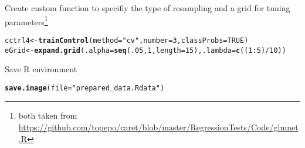 \documentclass{article}\usepackage[]{graphicx}\usepackage[]{color}
\makeatletter
\newcommand{\hlnum}[1]{\textcolor[rgb]{0.686,0.059,0.569}{#1}}%
\newcommand{\hlstr}[1]{\textcolor[rgb]{0.192,0.494,0.8}{#1}}%
\newcommand{\hlopt}[1]{\textcolor[rgb]{0,0,0}{#1}}%
\newcommand{\hlstd}[1]{\textcolor[rgb]{0.345,0.345,0.345}{#1}}%
\newcommand{\hlkwb}[1]{\textcolor[rgb]{0.69,0.353,0.396}{#1}}%
\newcommand{\hlkwc}[1]{\textcolor[rgb]{0.333,0.667,0.333}{#1}}%
\newcommand{\hlkwd}[1]{\textcolor[rgb]{0.737,0.353,0.396}{\textbf{#1}}}%
\newenvironment{kframe}{%
 \def\at@end@of@kframe{}%
 \ifinner\ifhmode%
  \def\at@end@of@kframe{\end{minipage}}%
  \begin{minipage}{\columnwidth}%
 \fi\fi%
 \def\FrameCommand##1{\hskip\@totalleftmargin \hskip-\fboxsep
 \colorbox{shadecolor}{##1}\hskip-\fboxsep
     \hskip-\linewidth \hskip-\@totalleftmargin \hskip\columnwidth}%
 \MakeFramed {\advance\hsize-\width
   \@totalleftmargin\z@ \linewidth\hsize
   \@setminipage}}%
 {\par\unskip\endMakeFramed%
 \at@end@of@kframe}
\newenvironment{knitrout}{}{} %
\makeatother
\begin{document}
Create custom function to specifiy the type of resampling and a grid for tuning parameters\footnote{both taken from \url{https://github.com/topepo/caret/blob/master/RegressionTests/Code/glmnet.R}}
\begin{knitrout}
\color{fgcolor}\begin{kframe}
\begin{alltt}
\hlstd{cctrl4} \hlkwb{<-} \hlkwd{trainControl}\hlstd{(}\hlkwc{method} \hlstd{=} \hlstr{"cv"}\hlstd{,} \hlkwc{number} \hlstd{=} \hlnum{3}\hlstd{,} \hlkwc{classProbs} \hlstd{=} \hlnum{TRUE}\hlstd{)}
\hlstd{eGrid} \hlkwb{<-} \hlkwd{expand.grid}\hlstd{(}\hlkwc{.alpha} \hlstd{=} \hlkwd{seq}\hlstd{(}\hlnum{.05}\hlstd{,} \hlnum{1}\hlstd{,} \hlkwc{length} \hlstd{=} \hlnum{15}\hlstd{),} \hlkwc{.lambda} \hlstd{=} \hlkwd{c}\hlstd{((}\hlnum{1}\hlopt{:}\hlnum{5}\hlstd{)}\hlopt{/}\hlnum{10}\hlstd{))}
\end{alltt}
\end{kframe}
\end{knitrout}

Save R environment 
\begin{knitrout}
\color{fgcolor}\begin{kframe}
\begin{alltt}
\hlkwd{save.image}\hlstd{(}\hlkwc{file}\hlstd{=}\hlstr{"prepared_data.Rdata"}\hlstd{)}
\end{alltt}
\end{kframe}
\end{knitrout}
\end{document}
